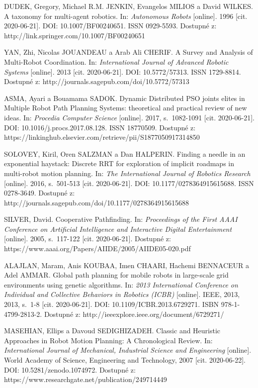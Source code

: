 \begin{thebibliography}{99}
DUDEK, Gregory, Michael R.M. JENKIN, Evangelos MILIOS a David WILKES. A taxonomy for multi-agent robotics. In: \textit{Autonomous Robots} [online]. 1996 [cit. 2020-06-21]. DOI: 10.1007/BF00240651. ISSN 0929-5593. Dostupné z: http://link.springer.com/10.1007/BF00240651

YAN, Zhi, Nicolas JOUANDEAU a Arab Ali CHERIF. A Survey and Analysis of Multi-Robot Coordination. In: \textit{International Journal of Advanced Robotic Systems} [online]. 2013 [cit. 2020-06-21]. DOI: 10.5772/57313. ISSN 1729-8814. Dostupné z: http://journals.sagepub.com/doi/10.5772/57313

ASMA, Ayari a Bouamama SADOK. Dynamic Distributed PSO joints elites in Multiple Robot Path Planning Systems: theoretical and practical review of new ideas. In: \textit{Procedia Computer Science} [online]. 2017, s.~1082-1091 [cit. 2020-06-21]. DOI: 10.1016/j.procs.2017.08.128. ISSN 18770509. Dostupné z: https://linkinghub.elsevier.com/retrieve/pii/S1877050917314850

SOLOVEY, Kiril, Oren SALZMAN a Dan HALPERIN. Finding a needle in an exponential haystack: Discrete RRT for exploration of implicit roadmaps in multi-robot motion planning. In: \textit{The International Journal of Robotics Research} [online]. 2016, s.~501-513 [cit. 2020-06-21]. DOI: 10.1177/0278364915615688. ISSN 0278-3649. Dostupné z: http://journals.sagepub.com/doi/10.1177/0278364915615688

SILVER, David. Cooperative Pathfinding. In: \textit{Proceedings of the First AAAI Conference on Artificial Intelligence and Interactive Digital Entertainment} [online]. 2005, s.~117-122 [cit. 2020-06-21]. Dostupné z: https://www.aaai.org/Papers/AIIDE/2005/AIIDE05-020.pdf

ALAJLAN, Maram, Anis KOUBAA, Imen CHAARI, Hachemi BENNACEUR a Adel AMMAR. Global path planning for mobile robots in large-scale grid environments using genetic algorithms. In: \textit{2013 International Conference on Individual and Collective Behaviors in Robotics (ICBR)} [online]. IEEE, 2013, 2013, s.~1-8 [cit. 2020-06-21]. DOI: 10.1109/ICBR.2013.6729271. ISBN 978-1-4799-2813-2. Dostupné z: http://ieeexplore.ieee.org/document/6729271/

MASEHIAN, Ellips a Davoud SEDIGHIZADEH. Classic and Heuristic Approaches in Robot Motion Planning: A Chronological Review. In: \textit{International Journal of Mechanical, Industrial Science and Engineering} [online]. World Academy of Science, Engineering and Technology, 2007 [cit. 2020-06-22]. DOI: 10.5281/zenodo.1074972. Dostupné z: https://www.researchgate.net/publication/249714449


\end{thebibliography}
